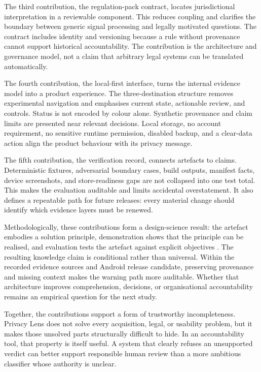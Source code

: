The third contribution, the regulation-pack contract, locates jurisdictional interpretation in a reviewable component. This reduces coupling and clarifies the boundary between generic signal processing and legally motivated questions. The contract includes identity and versioning because a rule without provenance cannot support historical accountability. The contribution is the architecture and governance model, not a claim that arbitrary legal systems can be translated automatically.

The fourth contribution, the local-first interface, turns the internal evidence model into a product experience. The three-destination structure removes experimental navigation and emphasises current state, actionable review, and controls. Status is not encoded by colour alone. Synthetic provenance and claim limits are presented near relevant decisions. Local storage, no account requirement, no sensitive runtime permission, disabled backup, and a clear-data action align the product behaviour with its privacy message.

The fifth contribution, the verification record, connects artefacts to claims. Deterministic fixtures, adversarial boundary cases, build outputs, manifest facts, device screenshots, and store-readiness gaps are not collapsed into one test total. This makes the evaluation auditable and limits accidental overstatement. It also defines a repeatable path for future releases: every material change should identify which evidence layers must be renewed.

Methodologically, these contributions form a design-science result: the artefact embodies a solution principle, demonstration shows that the principle can be realised, and evaluation tests the artefact against explicit objectives \cite{hevner2004,peffers2007}. The resulting knowledge claim is conditional rather than universal. Within the recorded evidence sources and Android release candidate, preserving provenance and missing context makes the warning path more auditable. Whether that architecture improves comprehension, decisions, or organisational accountability remains an empirical question for the next study.

Together, the contributions support a form of trustworthy incompleteness. Privacy Lens does not solve every acquisition, legal, or usability problem, but it makes those unsolved parts structurally difficult to hide. In an accountability tool, that property is itself useful. A system that clearly refuses an unsupported verdict can better support responsible human review than a more ambitious classifier whose authority is unclear.

